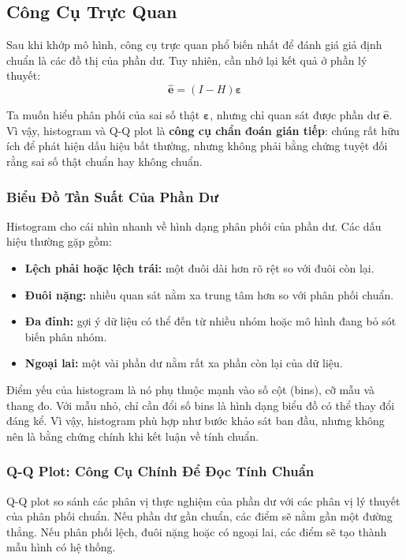 \subsection{Công Cụ Trực Quan}

Sau khi khớp mô hình, công cụ trực quan phổ biến nhất để đánh giá giả định chuẩn là các đồ thị của phần dư. Tuy nhiên, cần nhớ lại kết quả ở phần lý thuyết:
\[
  \hat{\mathbf{e}} = (I-H)\boldsymbol{\varepsilon}
\]

Ta muốn hiểu phân phối của sai số thật $\boldsymbol{\varepsilon}$, nhưng chỉ quan sát được phần dư $\hat{\mathbf{e}}$. Vì vậy, histogram và Q-Q plot là \textbf{công cụ chẩn đoán gián tiếp}: chúng rất hữu ích để phát hiện dấu hiệu bất thường, nhưng không phải bằng chứng tuyệt đối rằng sai số thật chuẩn hay không chuẩn.

\subsubsection{Biểu Đồ Tần Suất Của Phần Dư}

Histogram cho cái nhìn nhanh về hình dạng phân phối của phần dư. Các dấu hiệu thường gặp gồm:
\begin{itemize}
  \item \textbf{Lệch phải hoặc lệch trái:} một đuôi dài hơn rõ rệt so với đuôi còn lại.
  \item \textbf{Đuôi nặng:} nhiều quan sát nằm xa trung tâm hơn so với phân phối chuẩn.
  \item \textbf{Đa đỉnh:} gợi ý dữ liệu có thể đến từ nhiều nhóm hoặc mô hình đang bỏ sót biến phân nhóm.
  \item \textbf{Ngoại lai:} một vài phần dư nằm rất xa phần còn lại của dữ liệu.
\end{itemize}

Điểm yếu của histogram là nó phụ thuộc mạnh vào số cột (bins), cỡ mẫu và thang đo. Với mẫu nhỏ, chỉ cần đổi số bins là hình dạng biểu đồ có thể thay đổi đáng kể. Vì vậy, histogram phù hợp như bước khảo sát ban đầu, nhưng không nên là bằng chứng chính khi kết luận về tính chuẩn.

\subsubsection{Q-Q Plot: Công Cụ Chính Để Đọc Tính Chuẩn}

Q-Q plot so sánh các phân vị thực nghiệm của phần dư với các phân vị lý thuyết của phân phối chuẩn. Nếu phần dư gần chuẩn, các điểm sẽ nằm gần một đường thẳng. Nếu phân phối lệch, đuôi nặng hoặc có ngoại lai, các điểm sẽ tạo thành mẫu hình có hệ thống.

